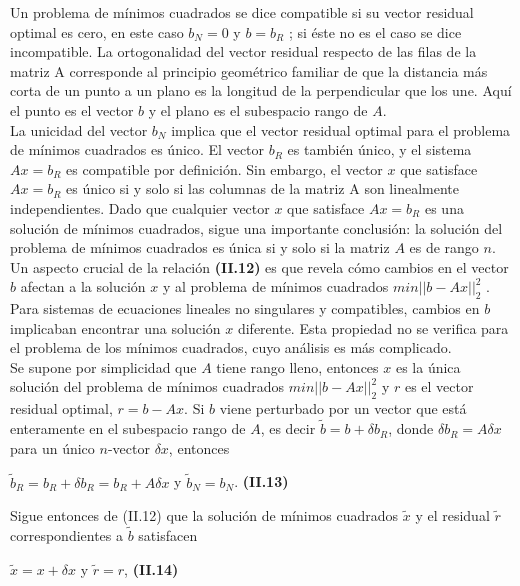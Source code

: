 \documentclass[twocolumn,twoside]{article}
\begin{document}
Un problema de m\'inimos cuadrados se dice compatible si su vector residual optimal es
cero, en este caso $b_N = 0$ y $b = b_R$ ; si \'este no es el caso se dice incompatible.
La ortogonalidad del vector residual respecto de las filas de la matriz A corresponde
al principio geom\'etrico familiar de que la distancia m\'as corta de un punto a un plano es
la longitud de la perpendicular que los une. Aqu\'i el punto es el vector $b$ y el plano es el
subespacio rango de $A$.\\
La unicidad del vector $b_N$ implica que el vector residual optimal para el problema
de m\'inimos cuadrados es \'unico. El vector $b_R$ es tambi\'en \'unico, y el sistema $A x = b_R$
es compatible por definici\'on. Sin embargo, el vector $x$ que satisface $A x = b_R$ es \'unico si
y solo si las columnas de la matriz A son linealmente independientes. Dado que cualquier
vector $x$ que satisface $A x = b_R$ es una soluci\'on de m\'inimos cuadrados, sigue una
importante conclusi\'on: la soluci\'on del problema de m\'inimos cuadrados es \'unica
si y solo si la matriz $A$ es de rango $n$.\\
Un aspecto crucial de la relaci\'on \textbf{(II.12)} es que revela c\'omo cambios en el vector
$b$ afectan a la soluci\'on $x$ y al problema de m\'inimos cuadrados $min ||b - A x||_2^2$ . Para
sistemas de ecuaciones lineales no singulares y compatibles, cambios en $b$ implicaban
encontrar una soluci\'on $x$ diferente. Esta propiedad no se verifica para el problema de los
m\'inimos cuadrados, cuyo an\'alisis es m\'as complicado.\\
Se supone por simplicidad que $A$ tiene rango lleno, entonces $x$ es la \'unica soluci\'on
del problema de m\'inimos cuadrados $min ||b - A x||_2^2$ y $r$ es el vector residual optimal,
$r = b - A x$. Si $b$ viene perturbado por un vector que est\'a enteramente en el subespacio
rango de $A$, es decir  $\tilde{b}  = b + \delta b_R $, donde $\delta b_R = A \delta x$ para un \'unico $n$-vector $\delta x$, entonces

\begin{center}
  $ \tilde{b}_R = b_R + \delta b_R = b_R + A\delta x $ y $ \tilde{b}_N = b_N $. \textbf{(II.13)}

\end{center}
Sigue entonces de (II.12) que la soluci\'on de m\'inimos cuadrados $\tilde{x}$ y el residual $\tilde{r}$
correspondientes a $\tilde{b}$ satisfacen
\begin{center}
  $\tilde{x}= x + \delta x$ y $\tilde{r}= r$, \hspace{0.5cm}\textbf{(II.14)}
\end{center}
\end{document}
